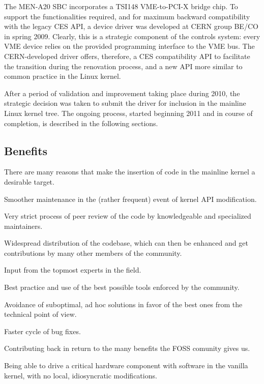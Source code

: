 \documentclass{JAC2003}
\begin{document}
The MEN-A20 SBC incorporates a TSI148 VME-to-PCI-X bridge chip.
To support the functionalities required, and for maximum backward
compatibility with the legacy CES API, a device driver was developed
at CERN group BE/CO in spring 2009. Clearly, this is a strategic
component of the controls system: every VME device relies on the
provided programming interface to the VME bus. The CERN-developed driver
offers, therefore, a CES compatibility API to facilitate the transition
during the renovation process, and a new API more similar to common
practice
in the Linux kernel.

After a period of validation and improvement taking place during 2010,
the strategic decision was taken to submit the driver for
inclusion in the mainline Linux kernel tree. The ongoing process, started
beginning 2011 and in course of completion, is described in the following
sections.

\subsection{Benefits}

There are many reasons that make the insertion of code in the mainline
kernel a desirable target.

\begin{Itemize}
\item Smoother maintenance in the (rather frequent) event of kernel API
    modification.
\item Very strict process of peer review of the code by knowledgeable
    and specialized maintainers.
\item Widespread distribution of the codebase, which can then be
    enhanced and get contributions by many other members of the community.
\item Input from the topmost experts in the field.
\item Best practice and use of the best possible tools enforced by
    the community.
\item Avoidance of suboptimal, ad hoc solutions in favor of the
    best ones from the technical point of view.
\item Faster cycle of bug fixes.
\item Contributing back in return to the many benefits the FOSS comunity
    gives us.
\item Being able to drive a critical hardware component with software
    in the vanilla kernel, with no local, idiosyncratic modifications.
\end{Itemize}
\end{document}
